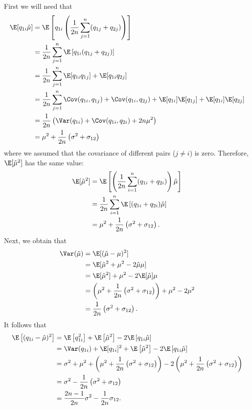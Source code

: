 \documentclass[11pt]{article}
\begin{document}
First we will need that
\begin{align*}
  \E[ q_{1i} \hat{\mu} ]
  &=
    \E\left[ q_{1i} \left( \frac{1}{2n} \sum_{j=1}^n ( q_{1j} + q_{2j} ) \right) \right]
  \\
  &=
    \frac{1}{2n} \sum_{j=1}^n \E\left[ q_{1i} ( q_{1j} + q_{2j} ) \right]
  \\
  &=
    \frac{1}{2n} \sum_{j=1}^n \E[ q_{1i} q_{1j} ] + \E[ q_{1i} q_{2j} ]
  \\
  &=
    \frac{1}{2n} \sum_{j=1}^n \Cov( q_{1i}, q_{1j} ) + \Cov( q_{1i}, q_{2j} ) + \E[ q_{1i}] \E[q_{1j} ] + \E[ q_{1i}] \E[q_{2j} ]
  \\
  &=
    \frac{1}{2n} \left( \Var( q_{1i}) + \Cov( q_{1i}, q_{2i} ) + 2 n \mu^2 \right)
  \\
  &=
    \mu^2 + \frac{1}{2n} \left( \sigma^2 + \sigma_{12} \right)
\end{align*}
where we assumed that the covariance of different pairs ($j \ne i$) is zero.
Therefore, $\E[ \hat{\mu}^2 ]$ has the same value:
\begin{align*}
  \E[ \hat{\mu}^2 ]
  &=
    \E\left[ \left( \frac{1}{2n} \sum_{i=1}^n ( q_{1i} + q_{2i} ) \right) \hat{\mu} \right]
  \\
  &=
    \frac{1}{2n} \sum_{i=1}^n \E\left[ ( q_{1i} + q_{2i} ) \hat{\mu} \right]
  \\
  &=
    \mu^2 + \frac{1}{2n} \left( \sigma^2 + \sigma_{12} \right)
  .
\end{align*}
Next, we obtain that
\begin{align*}
  \Var( \hat{\mu} )
  &=
    \E[ (\hat{\mu} - \mu)^2 ]
  \\
  &=
    \E[ \hat{\mu}^2 + \mu^2 - 2 \hat{\mu}\mu ]
  \\
  &=
    \E[ \hat{\mu}^2 ] + \mu^2 - 2 \E[ \hat{\mu} ] \mu
  \\
  &=
    \left(
    \mu^2
    +
    \frac{1}{2n} \left(
    \sigma^2
    + \sigma_{12}
    \right)
    \right)
    + \mu^2 - 2 \mu^2
  \\
  &=
    \frac{1}{2n} \left(
    \sigma^2
    + \sigma_{12}
    \right)
    .
\end{align*}
It follows that
\begin{align*}
  \E \left[ ( q_{1i} - \hat{\mu} )^2 \right]
  &=
    \E \left[ q_{1i}^2 \right] + \E \left[ \hat{\mu}^2 \right] - 2 \E \left[ q_{1i} \hat{\mu} \right]
  \\
  &=
    \Var( q_{1i} ) + \E[ q_{1i} ]^2
    + \E \left[ \hat{\mu} ^2 \right]
    - 2 \E \left[ q_{1i} \hat{\mu} \right]
  \\
  &=
    \sigma^2 + \mu^2
    + \left( \mu^2 + \frac{1}{2n} \left( \sigma^2 + \sigma_{12} \right) \right)
    - 2 \left( \mu^2 + \frac{1}{2n} \left( \sigma^2 + \sigma_{12} \right) \right)
  \\
  &=
    \sigma^2
    - \frac{1}{2n} \left( \sigma^2 + \sigma_{12} \right)
  \\
  &=
    \frac{2n-1}{2n} \sigma^2
    - \frac{1}{2n} \sigma_{12}
    .
\end{align*}
\end{document}

